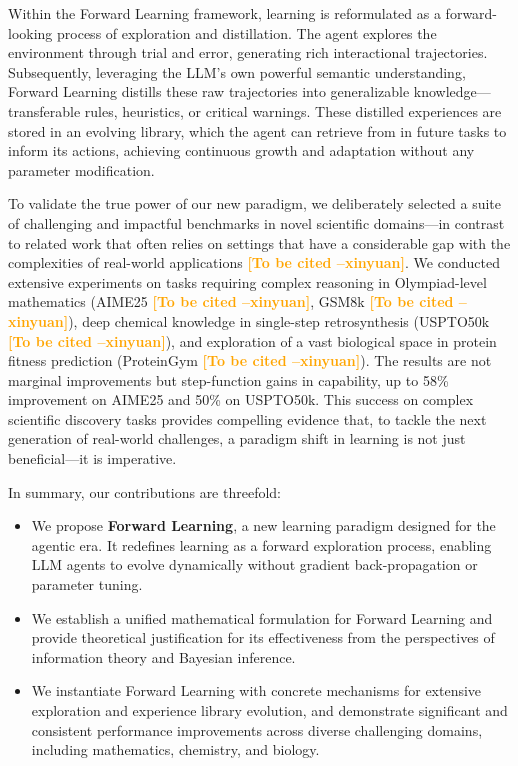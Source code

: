 \documentclass{article}
\newcommand{\method}{Forward Learning}
\newcommand{\xinyuan}[1]{\textcolor{orange}{\bf \small [#1 --xinyuan]}}
\begin{document}
Within the \method{} framework, learning is reformulated as a forward-looking process of exploration and distillation. The agent explores the environment through trial and error, generating rich interactional trajectories. Subsequently, leveraging the LLM's own powerful semantic understanding, \method{} distills these raw trajectories into generalizable knowledge—transferable rules, heuristics, or critical warnings. These distilled experiences are stored in an evolving library, which the agent can retrieve from in future tasks to inform its actions, achieving continuous growth and adaptation without any parameter modification.

To validate the true power of our new paradigm, we deliberately selected a suite of challenging and impactful benchmarks in novel scientific domains—in contrast to related work that often relies on settings that have a considerable gap with the complexities of real-world applications \xinyuan{To be cited}. We conducted extensive experiments on tasks requiring complex reasoning in Olympiad-level mathematics (AIME25 \xinyuan{To be cited}, GSM8k \xinyuan{To be cited}), deep chemical knowledge in single-step retrosynthesis (USPTO50k \xinyuan{To be cited}), and exploration of a vast biological space in protein fitness prediction (ProteinGym \xinyuan{To be cited}). The results are not marginal improvements but step-function gains in capability, up to 58\% improvement on AIME25 and 50\% on USPTO50k. This success on complex scientific discovery tasks provides compelling evidence that, to tackle the next generation of real-world challenges, a paradigm shift in learning is not just beneficial—it is imperative.

In summary, our contributions are threefold:
\begin{itemize}[leftmargin=*]
    \item We propose \textbf{\method{}}, a new learning paradigm designed for the agentic era. It redefines learning as a forward exploration process, enabling LLM agents to evolve dynamically without gradient back-propagation or parameter tuning.
    \item We establish a unified mathematical formulation for \method{} and provide theoretical justification for its effectiveness from the perspectives of information theory and Bayesian inference.
    \item We instantiate \method{} with concrete mechanisms for extensive exploration and experience library evolution, and demonstrate significant and consistent performance improvements across diverse challenging domains, including mathematics, chemistry, and biology.
\end{itemize}
\end{document}
